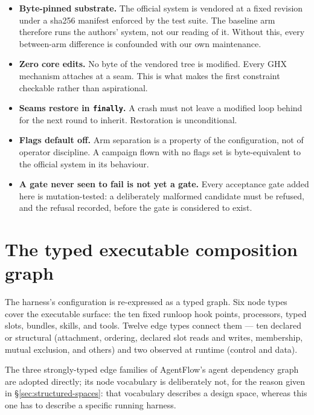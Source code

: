 \begin{itemize}
  \item \textbf{Byte-pinned substrate.} The official system is vendored at
        a fixed revision under a sha256 manifest enforced by the test
        suite. The baseline arm therefore runs the authors' system, not our
        reading of it. Without this, every between-arm difference is
        confounded with our own maintenance.
  \item \textbf{Zero core edits.} No byte of the vendored tree is modified.
        Every GHX mechanism attaches at a seam. This is what makes the
        first constraint checkable rather than aspirational.
  \item \textbf{Seams restore in \texttt{finally}.} A crash must not leave
        a modified loop behind for the next round to inherit. Restoration
        is unconditional.
  \item \textbf{Flags default off.} Arm separation is a property of the
        configuration, not of operator discipline. A campaign flown with
        no flags set is byte-equivalent to the official system in its
        behaviour.
  \item \textbf{A gate never seen to fail is not yet a gate.} Every
        acceptance gate added here is mutation-tested: a deliberately
        malformed candidate must be refused, and the refusal recorded,
        before the gate is considered to exist.
\end{itemize}

\section{The typed executable composition graph}
\label{sec:composition-graph}

The harness's configuration is re-expressed as a typed graph. Six node
types cover the executable surface: the ten fixed runloop hook points,
processors, typed slots, bundles, skills, and tools. Twelve edge types
connect them --- ten declared or structural (attachment, ordering, declared
slot reads and writes, membership, mutual exclusion, and others) and two
observed at runtime (control and data).

The three strongly-typed edge families of AgentFlow's agent dependency
graph~\cite{agentflow} are adopted directly; its node vocabulary is
deliberately not, for the reason given in \S\ref{sec:structured-spaces}:
that vocabulary describes a design space, whereas this one has to describe
a specific running harness.

